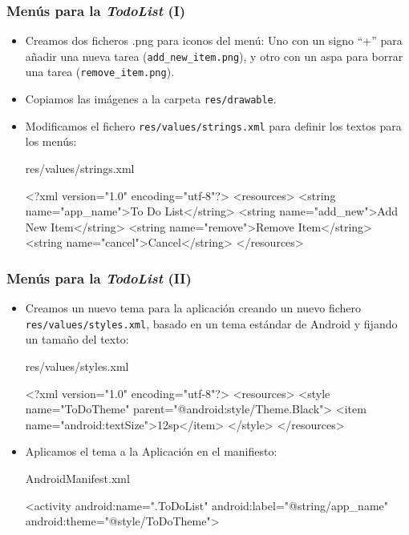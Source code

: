 \documentclass[hyperref={pdfpagelabels=true},ucs]{beamer}
\begin{document}
\begin{frame}[fragile]
\frametitle{Menús para la \emph{TodoList} (I)}

\begin{itemize}
\item Creamos dos ficheros .png para iconos del menú: Uno con un signo
  ``+'' para añadir una nueva tarea (\verb|add_new_item.png|), y otro
  con un aspa para borrar una tarea (\verb|remove_item.png|).
\item Copiamos las imágenes a la carpeta \verb|res/drawable|.
\item Modificamos el fichero \verb|res/values/strings.xml| para
  definir los textos para los menús:
\begin{tiny}
\begin{block}{res/values/strings.xml}
\begin{xml}
<?xml version="1.0" encoding="utf-8"?>
<resources>
  <string name="app_name">To Do List</string>
  <string name="add_new">Add New Item</string>
  <string name="remove">Remove Item</string>
  <string name="cancel">Cancel</string>
</resources>
\end{xml}
\end{block}
\end{tiny}
\end{itemize}


\end{frame}


\begin{frame}[fragile]
\frametitle{Menús para la \emph{TodoList} (II)}

\begin{itemize}

\item Creamos un nuevo tema para la aplicación creando un nuevo
  fichero \verb|res/values/styles.xml|, basado en un tema estándar de
  Android y fijando un tamaño del texto:

\begin{tiny}
\begin{block}{res/values/styles.xml}
\begin{xml}
<?xml version="1.0" encoding="utf-8"?>
<resources>
  <style name="ToDoTheme" parent="@android:style/Theme.Black">
    <item name="android:textSize">12sp</item>
  </style>
</resources>
\end{xml}
\end{block}
\end{tiny}

\item Aplicamos el tema a la Aplicación en el manifiesto:
\begin{tiny}
\begin{block}{AndroidManifest.xml}
\begin{xml}
<activity android:name=".ToDoList"
          android:label="@string/app_name"
          android:theme="@style/ToDoTheme">
\end{xml}
\end{block}
\end{tiny}
\end{itemize}


\end{frame}
\end{document}

